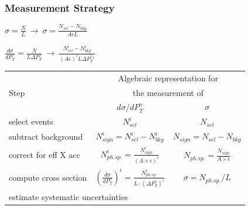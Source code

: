 \begin{frame}\frametitle{Measurement Strategy}
  \scriptsize

$\sigma = \frac{N}{L}~\rightarrow~\sigma = \frac{N_{sel}-N_{bkg}}{A \epsilon L}$ 

$\frac{d\sigma}{dP_T^{\gamma}} = \frac{N}{L \Delta P_T^{\gamma}}~\rightarrow~\frac{N_{sel}^i-N_{bkg}^{i}}{(A\epsilon)^i L \Delta P_T^{\gamma}^i}$

\begin{table}[h]
  \scriptsize
  \begin{center}
  \begin{tabular}{|l|c|c|}
    \hline
          & \multicolumn{2}{|c|}{Algebraic representation for} \\ 
     Step & \multicolumn{2}{|c|}{the measurement of} \\ 
          & $d\sigma/dP_{T}^{\gamma}$ & $\sigma$ \\ \hline
    select events & {\bfseries{$N_{sel}^i$}} &    {\bfseries{$N_{sel}$}}       \\ \hline
    subtract background & {\bfseries{$N_{sign}^i = N_{sel}^i - N_{bkg}^i$}} &    {\bfseries{$N_{sign}=N_{sel}-N_{bkg}$}}       \\ \hline
    correct for eff X acc & $N_{ph.sp.}^i = \frac{N_{sign}^i}{(A \times\epsilon)^i}$ &  $N_{ph.sp.}=\frac{N_{sign}}{A\times\epsilon}$       \\ \hline
    compute cross section & $ \left( \frac{d\sigma}{dP_{T}^\gamma} \right) ^i = \frac{N_{ph.sp.}^i}{L \cdot (\Delta P_T^\gamma)^i}$  &  $\sigma = N_{ph.sp.}/L$       \\ \hline
    \multicolumn{3}{|l|}{estimate systematic uncertainties}          \\ \hline
  \end{tabular}
  \label{tab:analysisOutline}
  \end{center}
\end{table}
\end{frame}%
